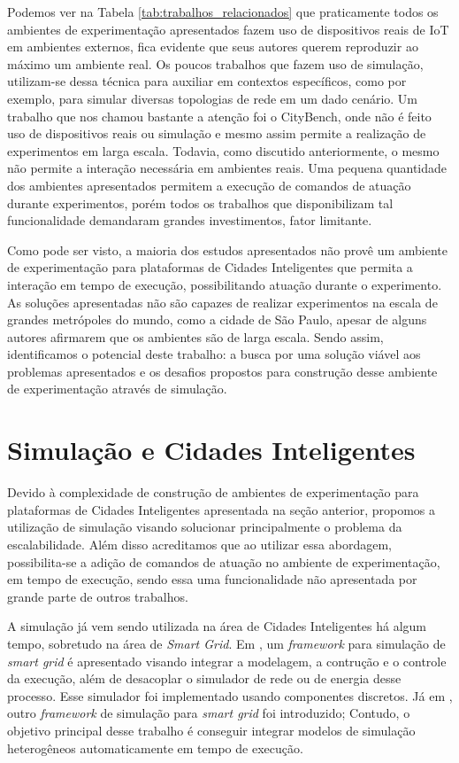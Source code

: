 Podemos ver na Tabela \ref{tab:trabalhos_relacionados} que praticamente todos os ambientes de experimentação apresentados fazem uso de dispositivos reais de IoT em ambientes externos, fica evidente que seus 
autores querem reproduzir ao máximo um ambiente real.
Os poucos trabalhos que fazem uso de simulação, utilizam-se dessa técnica para auxiliar em contextos específicos, como por exemplo, para simular diversas topologias de rede em um dado cenário.
Um trabalho que nos chamou bastante a atenção foi o CityBench, onde não é feito uso de dispositivos reais ou simulação e mesmo assim permite a realização de experimentos em larga escala.
Todavia, como discutido anteriormente, o mesmo não permite a interação necessária em ambientes reais.
Uma pequena quantidade dos ambientes apresentados permitem a execução de comandos de atuação durante experimentos, porém todos os trabalhos que disponibilizam tal funcionalidade demandaram grandes
investimentos, fator limitante.

Como pode ser visto, a maioria dos estudos apresentados não provê um ambiente de experimentação para plataformas de Cidades Inteligentes que permita a interação em tempo de execução, possibilitando
atuação durante o experimento.
As soluções apresentadas não são capazes de realizar experimentos na escala de grandes metrópoles do mundo, como a cidade de São Paulo, apesar de alguns autores afirmarem que os ambientes são de
larga escala.
Sendo assim, identificamos o potencial deste trabalho: a busca por uma solução viável aos problemas apresentados e os desafios propostos para construção desse ambiente de experimentação através
de simulação.

\section{Simulação e Cidades Inteligentes}

Devido à complexidade de construção de ambientes de experimentação para plataformas de Cidades Inteligentes apresentada na seção anterior, propomos a utilização de simulação visando solucionar
principalmente o problema da escalabilidade.
Além disso acreditamos que ao utilizar essa abordagem, possibilita-se a adição de comandos de atuação no ambiente de experimentação, em tempo de execução, sendo essa uma funcionalidade não apresentada
por grande parte de outros trabalhos.

A simulação já vem sendo utilizada na área de Cidades Inteligentes há algum tempo, sobretudo na área de \textit{Smart Grid}.
Em \cite{jsan_2016},  um \textit{framework} para simulação de \textit{smart grid} é apresentado visando integrar a modelagem, a contrução e o controle da execução, além de desacoplar o simulador de rede
ou de energia desse processo.
Esse simulador foi implementado usando componentes discretos.
Já em \cite{schutte_2011}, outro \textit{framework} de simulação para \textit{smart grid} foi introduzido; Contudo, o objetivo principal desse trabalho é conseguir integrar modelos de simulação
heterogêneos automaticamente em tempo de execução.


